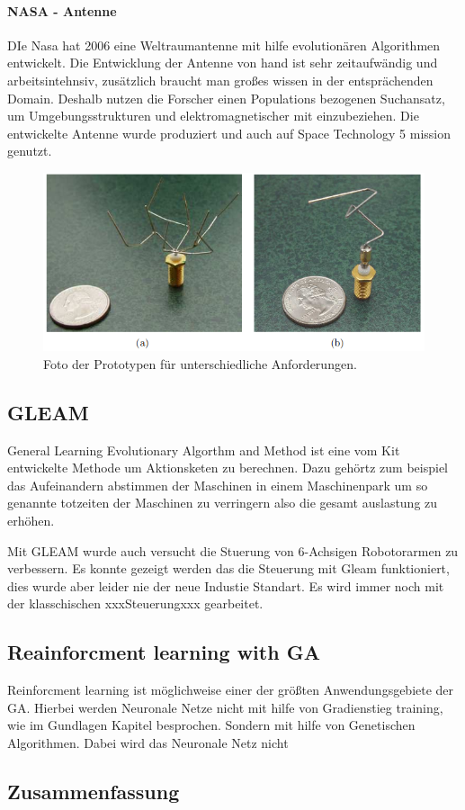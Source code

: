 \paragraph{NASA - Antenne}
DIe Nasa hat 2006 eine Weltraumantenne mit hilfe evolutionären Algorithmen entwickelt. Die Entwicklung der Antenne von hand ist sehr zeitaufwändig und arbeitsintehnsiv, zusätzlich braucht man großes wissen in der entsprächenden Domain. Deshalb nutzen die Forscher einen Populations bezogenen Suchansatz, um Umgebungsstrukturen und  elektromagnetischer mit einzubeziehen. Die entwickelte Antenne wurde produziert und auch auf Space Technology 5 mission genutzt.
\cite{AutomatedAntenna}
\noindent%
\begin{figure}[H]
  \centering  
  \includegraphics[scale=0.5]{img/nasa-antenne.png}
  \caption{Foto der Prototypen für unterschiedliche Anforderungen. \cite{AutomatedAntenna}}
  \label{fig:Ablauf_kurz}
\end{figure}


\subsection{GLEAM}
General Learning Evolutionary Algorthm and Method ist eine vom Kit entwickelte Methode um Aktionsketen zu berechnen. Dazu gehörtz zum beispiel das Aufeinandern abstimmen der Maschinen in einem Maschinenpark um so genannte totzeiten der Maschinen zu verringern also die gesamt auslastung zu erhöhen.

Mit GLEAM wurde auch versucht die Stuerung von 6-Achsigen Robotorarmen zu verbessern. Es konnte gezeigt werden das die Steuerung mit Gleam funktioniert, dies wurde aber leider nie der neue Industie Standart. Es wird immer noch mit der klasschischen xxxSteuerungxxx  gearbeitet. 


\subsection{Reainforcment learning with GA}
Reinforcment learning ist möglichweise einer der größten Anwendungsgebiete der GA. Hierbei werden Neuronale Netze nicht mit hilfe von Gradienstieg training, wie im Gundlagen Kapitel besprochen. Sondern mit hilfe von Genetischen Algorithmen. Dabei wird das Neuronale Netz nicht 




\subsection{Zusammenfassung}